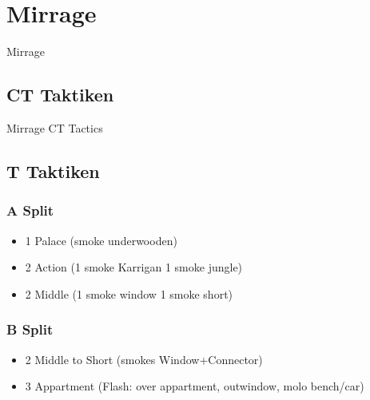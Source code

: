 \newpage




\chapter{Mirrage}
\label{chap:mirrage}
Mirrage

\section{CT Taktiken}
\label{sect:mirrage_ct}
Mirrage CT Tactics

\section{T Taktiken}
\label{sect:Mirrage_t}
\subsection{A Split}
\label{subsect:mirrage_a_split}
\begin{itemize}
\item 1 Palace (smoke underwooden)
\item 2 Action (1 smoke Karrigan 1 smoke jungle)
\item 2 Middle (1 smoke window 1 smoke short)
\end{itemize}

\subsection{B Split}
\label{subsect:mirrage_b_split}
\begin{itemize}
\item 2 Middle to Short (smokes Window+Connector)
\item 3 Appartment (Flash: over appartment, outwindow, molo bench/car)
\end{itemize}



